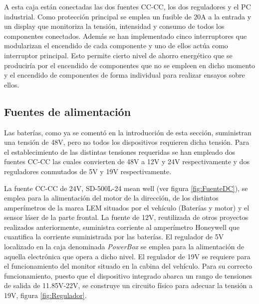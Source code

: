 A esta caja están conectadas las dos fuentes CC-CC, los dos reguladores y el PC industrial. Como protección principal se emplea un fusible de 20A a la entrada y un display que monitoriza la tensión, intensidad y consumo de todos los componentes conectados. Además se han implementado cinco interruptores que modularizan el encendido de cada componente y uno de ellos actúa como interruptor principal. Esto permite cierto nivel de ahorro energético que se produciría por el encendido de componentes que no se empleen en dicho momento y el encendido de componentes de forma individual para realizar ensayos sobre ellos.  

\subsection{Fuentes de alimentación}
Las baterías, como ya se comentó en la introducción de esta sección, suministran una tensión de 48V, pero no todos los dispositivos requieren dicha tensión. Para el establecimiento de las distintas tensiones requeridas se han empleado dos fuentes CC-CC las cuales convierten de 48V a 12V y 24V respectivamente y dos reguladores conmutados de 5V y 19V respectivamente. 

La fuente CC-CC de 24V, SD-500L-24 mean well (ver figura \ref{fig:FuenteDC}), se emplea para la alimentación del motor de la dirección, de los distintos amperímetros de la marca LEM situados por el vehículo (Baterías y motor) y el sensor láser de la parte frontal. La fuente de 12V, reutilizada de otros proyectos realizados anteriormente, suministra corriente al amperímetro Honeywell que cuantifica la corriente suministrada por las baterías. El regulador de 5V localizado en la caja denominada \textit{PowerBox} se emplea para la alimentación de aquella electrónica que opera a dicho nivel. El regulador de 19V se requiere para el funcionamiento del monitor situado en la cabina del vehículo. Para su correcto funcionamiento, puesto que el dispositivo integrado abarca un rango de tensiones de salida de 11.85V-22V, se construye un circuito físico para adecuar la tensión a 19V, figura \ref{fig:Regulador}.

